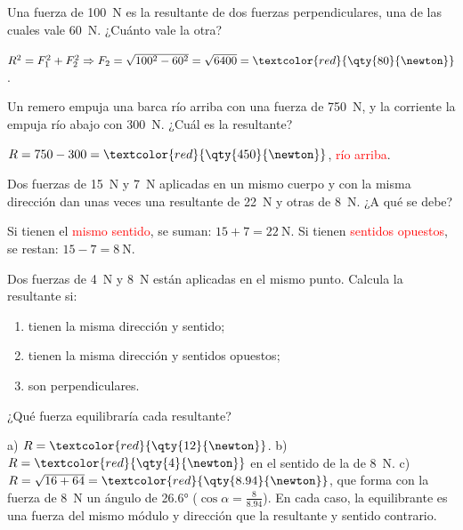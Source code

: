 \begin{exercise}
    Una fuerza de \qty{100}{\newton} es la resultante de dos fuerzas perpendiculares, una de las cuales vale \qty{60}{\newton}. ¿Cuánto vale la otra?
    \begin{solu}
        \(R^2 = F_1^2 + F_2^2 \Rightarrow F_2 = \sqrt{100^2 - 60^2} = \sqrt{6400} = \textcolor{red}{\qty{80}{\newton}}\).
    \end{solu}
\end{exercise}

\begin{exercise}
    Un remero empuja una barca río arriba con una fuerza de \qty{750}{\newton}, y la corriente la empuja río abajo con \qty{300}{\newton}. ¿Cuál es la resultante?
    \begin{solu}
        \(R = 750 - 300 = \textcolor{red}{\qty{450}{\newton}}\), \textcolor{red}{río arriba}.
    \end{solu}
\end{exercise}

\begin{exercise}
    Dos fuerzas de \qty{15}{\newton} y \qty{7}{\newton} aplicadas en un mismo cuerpo y con la misma dirección dan unas veces una resultante de \qty{22}{\newton} y otras de \qty{8}{\newton}. ¿A qué se debe?
    \begin{solu}
        Si tienen el \textcolor{red}{mismo sentido}, se suman: \(15 + 7 = \qty{22}{\newton}\). Si tienen \textcolor{red}{sentidos opuestos}, se restan: \(15 - 7 = \qty{8}{\newton}\).
    \end{solu}
\end{exercise}

\begin{exercise}
    Dos fuerzas de \qty{4}{\newton} y \qty{8}{\newton} están aplicadas en el mismo punto. Calcula la resultante si:
    \begin{enumerate}[label=\alph*)]
        \item tienen la misma dirección y sentido;
        \item tienen la misma dirección y sentidos opuestos;
        \item son perpendiculares.
    \end{enumerate}
    ¿Qué fuerza equilibraría cada resultante?
    \begin{solu}
        a) \(R = \textcolor{red}{\qty{12}{\newton}}\). b) \(R = \textcolor{red}{\qty{4}{\newton}}\) en el sentido de la de \qty{8}{\newton}. c) \(R = \sqrt{16 + 64} = \textcolor{red}{\qty{8.94}{\newton}}\), que forma con la fuerza de \qty{8}{\newton} un ángulo de \ang{26.6} (\(\cos\alpha = \frac{8}{\num{8.94}}\)). En cada caso, la equilibrante es una fuerza del mismo módulo y dirección que la resultante y sentido contrario.
    \end{solu}
\end{exercise}

